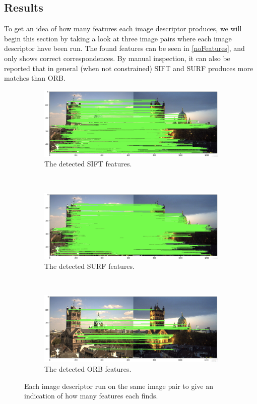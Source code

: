 \subsection{Results}
To get an idea of how many features each image descriptor produces, we will begin this section by taking a look at three image pairs where each image descriptor have been run. The found features can be seen in \autoref{noFeatures}, and only shows correct correspondences. By manual inspection, it can also be reported that in general (when not constrained) SIFT and SURF produces more matches than ORB.

\begin{figure}[h]
	\centering
	\begin{subfigure}{0.8\linewidth}
		\centering
		\includegraphics[width=\linewidth]{Materials/SIFTMatches}
		\caption{The detected SIFT features.}
	\end{subfigure}
	\\
	\begin{subfigure}{0.8\linewidth}
		\centering
		\includegraphics[width=\linewidth]{Materials/SURFMatches}
		\caption{The detected SURF features.}
	\end{subfigure}
	\\
	\begin{subfigure}{0.8\linewidth}
		\centering
		\includegraphics[width=\linewidth]{Materials/ORBMatches}
		\caption{The detected ORB features.}
	\end{subfigure}
	\caption{Each image descriptor run on the same image pair to give an indication of how many features each finds.}
	\label{noFeatures}
\end{figure}

